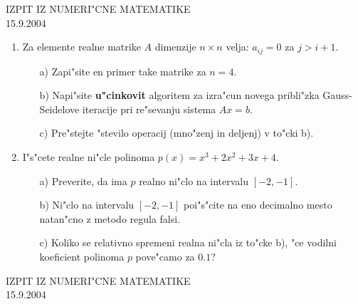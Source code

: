 \documentclass[12pt,a4paper]{article}
\begin{document}
\large
\begin{center}
  {\Large IZPIT IZ NUMERI"CNE MATEMATIKE\\
        15.9.2004
    }
\end{center}
\vspace{1.5cm}
\begin{enumerate}
        \item Za elemente realne matrike $A$ dimenzije $n\times n$ 
          velja: $a_{ij}=0$ za $j>i+1$.
          \begin{itemize}
            \item[a)] Zapi"site en primer take matrike za $n=4$.
            \item[b)] Napi"site {\bf u"cinkovit} algoritem za 
              izra"cun novega pribli"zka Gauss-Seidelove iteracije pri re"sevanju 
	      sistema $A x = b$.
            \item[c)] Pre"stejte "stevilo operacij (mno"zenj in deljenj)
              v to"cki b).
          \end{itemize} 
        \item I"s"cete realne ni"cle polinoma $p(x)=x^3+2x^2+3x+4$.
        \begin{itemize}
                \item[a)] Preverite, da ima $p$ realno ni"clo na
                  intervalu $[-2,-1]$.
                \item[b)] Ni"clo na intervalu $[-2,-1]$ poi"s"cite na
                  eno decimalno mesto na\-tan\-"cno z metodo regula falsi.
                \item[c)] Koliko se relativno spremeni realna ni"cla
                  iz to"cke b), "ce vodilni koeficient polinoma $p$
                  pove"camo za $0.1$?
        \end{itemize} 
\end{enumerate}
\newpage
\begin{center}
  {\Large IZPIT IZ NUMERI"CNE MATEMATIKE\\
        15.9.2004
    }
\end{center}
\vspace{1.5cm}
\end{document}

